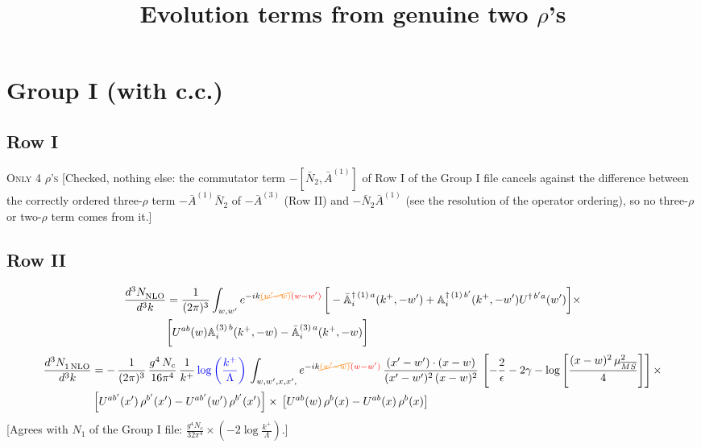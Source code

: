 \documentclass[9pt]{article}
\title{Evolution terms from genuine two $\rho$'s}
\author{}
\date{}
\def\mf#1{\mathbb{#1}}
\numberwithin{equation}{section}
\begin{document}
\maketitle {}\par
\section{Group I (with c.c.)}
\subsection{Row I}
\textsc{Only 4 $\rho$'s} {\color{red}[Checked, nothing else: the commutator term $-[\bar N_{2},\bar A^{(1)}]$ of Row I of the Group I file cancels against the difference between the correctly ordered three-$\rho$ term $-\bar A^{(1)}\bar N_{2}$ of $-\bar A^{(3)}$ (Row II) and $-\bar N_{2}\bar A^{(1)}$ (see the resolution of the operator ordering), so no three-$\rho$ or two-$\rho$ term comes from it.]}
\subsection{Row II}
\begin{align}
    \frac{d^{3}N_{\rm NLO}^{\rm}}{d^{3}k} &  = \frac{1}{(2\pi)^{3}}  \int_{w, w^\prime} e^{-ik{\color{orange}\cancel{(w^\prime-w)}}{\color{red}(w-w^\prime)}}\,\bigg[-\bar{\mf{A}}^{\dagger\,(1)\,a}_{i}(k^{+},-w^{\prime})+\mf{A}^{\dagger\, (1)\, b^{\prime}}_{i}(k^{+},-w^{\prime})U^{\dagger\,b^{\prime}a}(w^{\prime})\bigg]\times \notag \\ & \bigg[U^{ab}(w)\mf{A}^{(3)\, b}_{i}(k^{+},- w)-\Bar{\mf{A}}^{(3)\, a}_{i}(k^{+}, - w)\bigg]\nonumber
\end{align}
\begin{align}
     \frac{d^{3}N_{1\,\rm NLO}^{\rm}}{d^{3}k} &  = -\,\frac{1}{(2\pi)^{3}}\, \frac{g^{4}\,N_{c}}{16\pi^{4}}\,\frac{1}{k^{+}}\,{\color{blue}\log{\left(\frac{k^{+}}{\Lambda}\right)}}\, \int_{w, w',x,x',} e^{-ik{\color{orange}\cancel{(w^\prime-w)}}{\color{red}(w-w^\prime)}}\, \frac{(x'-w')\cdot (x-w)}{(x'-w')^{2}\, (x-w)^{2}}\, \left[-\frac{2}{\epsilon}-2\gamma-\log{\left[\frac{(x-w)^{2}\,\mu^{2}_{\overline{MS}}}{4}\right]}\right]\times\notag \\ & \left[U^{ab'}(x')\,\rho^{b'}(x') - U^{ab'}(w')\,\rho^{b'}(x')\right]\times\,\left[U^{ab}(w)\,\rho^{b}(x) - U^{ab}(x)\,\rho^{b}(x)\right]
\end{align} {\color{red}[Agrees with $N_{1}$ of the Group I file: $\frac{g^{4}N_{c}}{32\pi^{4}}\times(-2\log\frac{k^{+}}{\Lambda})$.]}\par\noindent
\end{document}
